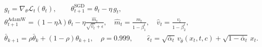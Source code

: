 \documentclass[border=3pt]{standalone}
\begin{document}
$\displaystyle\begin{gathered}
g_t=\nabla_{\theta}\mathcal L_t(\theta_t),\qquad
\theta_{t+1}^{\mathrm{SGD}}=\theta_t-\eta\,g_t,\\[3pt]
\theta_{t+1}^{\mathrm{AdamW}}=(1-\eta\lambda)\theta_t-\eta\frac{\widehat m_t}{\sqrt{\widehat v_t}+\epsilon},\quad
\widehat m_t=\frac{m_t}{1-\beta_1^t},\quad \widehat v_t=\frac{v_t}{1-\beta_2^t},\\[3pt]
\bar\theta_{k+1}=\rho\bar\theta_k+(1-\rho)\theta_{k+1},\quad \rho=0.999,\qquad
\hat\epsilon_t=\sqrt{\bar\alpha_t}\,v_{\bar\theta}(x_t,t,c)+\sqrt{1-\bar\alpha_t}\,x_t.
\end{gathered}$
\end{document}
